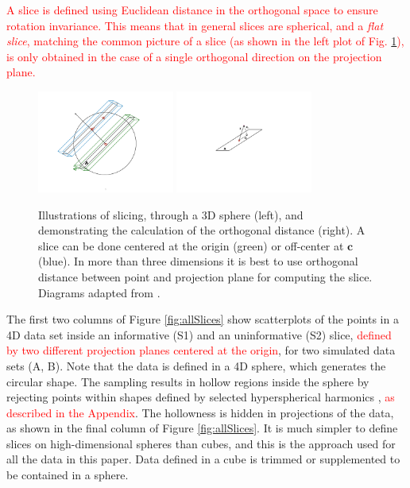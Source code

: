 \documentclass[]{interact}
\theoremstyle{plain}%
\theoremstyle{definition}
\theoremstyle{remark}
\begin{document}
\textcolor{red}{A slice is defined using Euclidean distance in the orthogonal space to ensure rotation invariance. This means that in general slices are spherical, and a \textit{flat slice}, matching the common picture of a slice (as shown in the left plot of Fig. \ref{fig:diagrams}), is only obtained in the case of a single orthogonal direction on the projection plane.}

\begin{figure}[ht]
\centerline{\includegraphics[width=0.4\textwidth]{diagrams/centered-slice.pdf}
\hspace{5mm}
\includegraphics[width=0.4\textwidth]{diagrams/orthogonal-distance.pdf}}
\caption{Illustrations of slicing, through a 3D sphere (left), and demonstrating the calculation of the orthogonal distance (right). A slice can be done centered at the origin (green) or off-center at $\mathbf{c}$ (blue). In more than three dimensions it is best to use orthogonal distance between point and projection plane for computing the slice. Diagrams adapted from \cite{laa2019slice}.}
\label{fig:diagrams}
\end{figure}

The first two columns of Figure \ref{fig:allSlices} show scatterplots of
the points in a 4D data set inside an informative (S1) and an
uninformative (S2) slice,
\textcolor{red}{defined by two different projection planes centered at the origin},
for two simulated data sets (A, B). Note that the data is defined in a
4D sphere, which generates the circular shape. The sampling results in
hollow regions inside the sphere by rejecting points within shapes
defined by selected hyperspherical harmonics
\citep{doi:10.1063/1.3054274},
\textcolor{red}{as described in the Appendix}. The hollowness is hidden
in projections of the data, as shown in the final column of Figure
\ref{fig:allSlices}. It is much simpler to define slices on
high-dimensional spheres than cubes, and this is the approach used for
all the data in this paper. Data defined in a cube is trimmed or
supplemented to be contained in a sphere.
\end{document}
